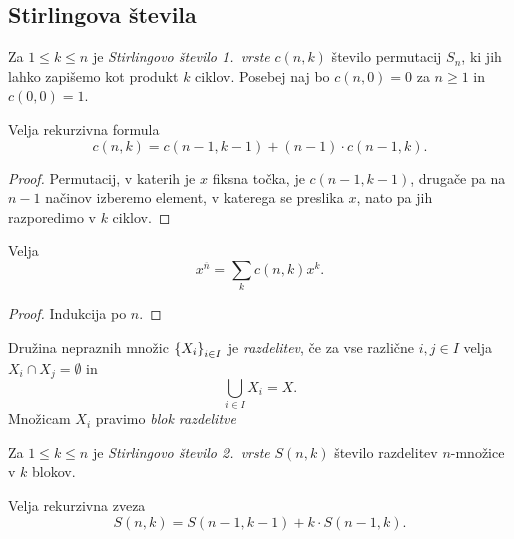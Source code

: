\obvs

\newpage

\subsection{Stirlingova števila}

\begin{definicija}
Za $1 \leq k \leq n$ je
\emph{Stirlingovo število 1.~vrste}
$c(n,k)$ število permutacij $S_n$, ki jih lahko zapišemo kot
produkt $k$ ciklov. Posebej naj bo $c(n,0) = 0$ za $n \geq 1$ in
$c(0,0) = 1$.
\end{definicija}


\begin{trditev}
Velja rekurzivna formula
\[
c(n, k) = c(n-1, k-1) + (n-1) \cdot c(n-1, k).
\]
\end{trditev}

\begin{proof}
Permutacij, v katerih je $x$ fiksna točka, je $c(n-1, k-1)$,
drugače pa na $n-1$ načinov izberemo element, v katerega se
preslika $x$, nato pa jih razporedimo v $k$ ciklov.
\end{proof}

\begin{izrek}
Velja
\[
x^{\overline{n}} = \sum_k c(n, k) x^k.
\]
\end{izrek}

\begin{proof}
Indukcija po $n$.
\end{proof}

\begin{definicija}
Družina nepraznih množic $\left\{X_i\right\}_{i \in I}$ je
\emph{razdelitev}, če za vse različne
$i, j \in I$ velja $X_i \cap X_j = \emptyset$ in
\[
\bigcup_{i \in I} X_i = X.
\]
Množicam $X_i$ pravimo \emph{blok razdelitve}
\end{definicija}

\begin{definicija}
Za $1 \leq k \leq n$ je
\emph{Stirlingovo število 2.~vrste}
$S(n, k)$ število razdelitev $n$-množice v $k$ blokov.
\end{definicija}

\begin{trditev}
Velja rekurzivna zveza
\[
S(n,k) = S(n-1, k-1) + k \cdot S(n-1, k).
\]
\end{trditev}

